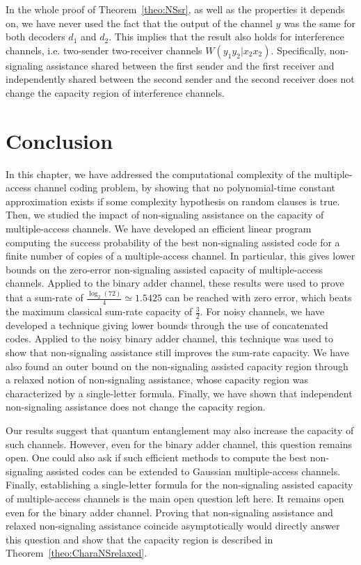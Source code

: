 \begin{rk}
  In the whole proof of Theorem~\ref{theo:NSsr}, as well as the properties it depends on, we have never used the fact that the output of the channel $y$ was the same for both decoders $d_1$ and $d_2$. This implies that the result also holds for interference channels, i.e. two-sender two-receiver channels $W(y_1y_2|x_2x_2)$. Specifically, non-signaling assistance shared between the first sender and the first receiver and independently shared between the second sender and the second receiver does not change the capacity region of interference channels.
\end{rk}
  
\section{Conclusion}
In this chapter, we have addressed the computational complexity of the multiple-access channel coding problem, by showing that no polynomial-time constant approximation exists if some complexity hypothesis on random clauses is true.
Then, we studied the impact of non-signaling assistance on the capacity of multiple-access channels. We have developed an efficient linear program computing the success probability of the best non-signaling assisted code for a finite number of copies of a multiple-access channel. In particular, this gives lower bounds on the zero-error non-signaling assisted capacity of multiple-access channels.
Applied to the binary adder channel, these results were used to prove that a sum-rate of $\frac{\log_2(72)}{4} \simeq 1.5425$ can be reached with zero error, which beats the maximum classical sum-rate capacity of $\frac{3}{2}$. For noisy channels, we have developed a technique giving lower bounds through the use of concatenated codes. Applied to the noisy binary adder channel, this technique was used to show that non-signaling assistance still improves the sum-rate capacity. We have also found an outer bound on the non-signaling assisted capacity region through a relaxed notion of non-signaling assistance, whose capacity region was characterized by a single-letter formula. Finally, we have shown that independent non-signaling assistance does not change the capacity region.

Our results suggest that quantum entanglement may also increase the capacity of such channels. However, even for the binary adder channel, this question remains open. One could also ask if such efficient methods to compute the best non-signaling assisted codes can be extended to Gaussian multiple-access channels. Finally, establishing a single-letter formula for the non-signaling assisted capacity of multiple-access channels is the main open question left here. It remains open even for the binary adder channel. Proving that non-signaling assistance and relaxed non-signaling assistance coincide asymptotically would directly answer this question and show that the capacity region is described in Theorem~\ref{theo:CharaNSrelaxed}.

